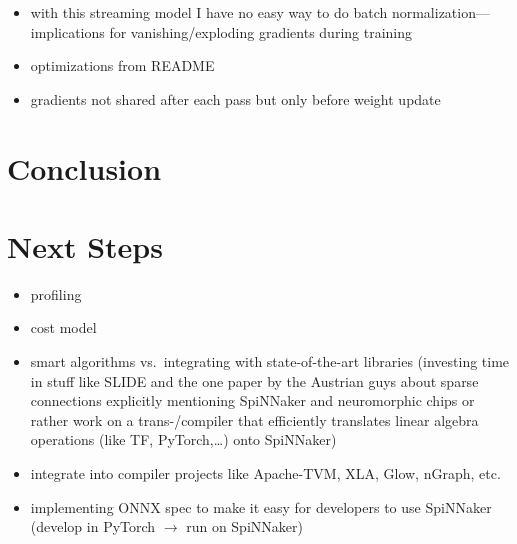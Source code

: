 \documentclass[]{article}
\begin{document}


\begin{itemize}
  \item with this streaming model I have no easy way to do batch
    normalization---implications for vanishing/exploding gradients
    during training
  \item optimizations from README
  \item gradients not shared after each pass but only before weight
    update
\end{itemize}




\section{Conclusion}
\label{sec:conclusion}


\section{Next Steps}
\label{sec:next_steps}

\begin{itemize}
  \item profiling
  \item cost model
  \item smart algorithms vs.\ integrating with state-of-the-art libraries
    (investing time in stuff like SLIDE and the one paper by the Austrian
    guys about sparse connections explicitly mentioning SpiNNaker and
    neuromorphic chips or rather work on a trans-/compiler
    that efficiently translates linear algebra operations (like TF,
    PyTorch,\dots) onto SpiNNaker)
  \item integrate into compiler projects like Apache-TVM, XLA, Glow,
   nGraph, etc.
  \item implementing ONNX spec to make it easy for developers to use
    SpiNNaker (develop in PyTorch $\rightarrow$ run on SpiNNaker)
\end{itemize}


\end{document}
